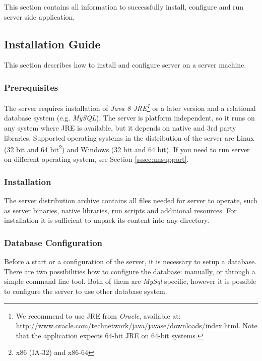 
This section contains all information to successfully install, configure and run
\textan{} server side application.

\subsection{Installation Guide}

This section describes how to install and configure \textan{} server on a server
machine.

\subsubsection{Prerequisites}
\label{sssec:SerInstPre}

The \textan{} server requires installation of \emph{Java 8 JRE\footnote{We
recommend to use JRE from \emph{Oracle}, available at:
\url{http://www.oracle.com/technetwork/java/javase/downloads/index.html}.
Note that the application expects 64-bit JRE on 64-bit systems.}}
or a later version and a relational database system (e.g. \emph{MySQL}).
The server is platform independent, so it runs on any system where JRE is
available, but it depends on native and 3rd party libraries. Supported
operating systems in the distribution of the \textan{} server are Linux (32 bit
and 64 bit\footnote{x86 (IA-32) and x86-64}) and Windows (32 bit and 64 bit).  If you need to
run \textan{} server on different operating system, see Section
\ref{sssec:unsupport}.

\subsubsection{Installation}

The \textan{} server distribution archive contains all files needed for \textan{} server to operate,
such as server binaries, native libraries, run scripts and additional resources.
For installation it is sufficient to unpack its content into any directory.

\subsubsection{Database Configuration}

Before a start or a configuration of the \textan{} server, it is necessary to
setup a database. There are two possibilities how to configure the database:
manually, or through a simple command line tool. Both of them are \emph{MySql} specific,
however it is possible to configure the server to use other database system.


